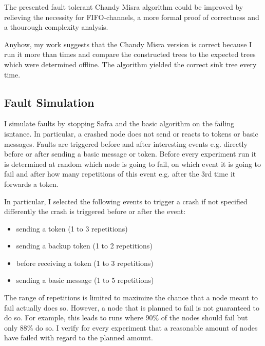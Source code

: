   The presented fault tolerant Chandy Misra algorithm could be improved by relieving the necessity for FIFO-channels, a more formal proof of correctness and a thourough complexity analysis.

  Anyhow, my work suggests that the Chandy Misra version is correct because I run it more than %
  times and compare the constructed trees to the expected trees which were determined offline. The algorithm yielded the correct sink tree every time.
   
  
  
\subsection{Fault Simulation}
	I simulate faults by stopping Safra and the basic algorithm on the failing isntance.
	In particular, a crashed node does not send or reacts to tokens or basic messages.
	Faults are triggered before and after interesting events e.g. directly before or after sending a basic message or token. 
	Before every experiment run it is determined at random which node is going to fail, on which event it is going to fail and after how many repetitions of this event e.g. after the 3rd time it forwards a token.
	
	In particular, I selected the following events to trigger a crash if not specified differently the crash is triggered before or after the event:
	\begin{itemize}
	   	\item sending a token (1 to 3 repetitions)
	   	\item sending a backup token (1 to 2 repetitions)
	   	\item before receiving a token (1 to 3 repetitions)
	   	\item sending a basic message (1 to 5 repetitions)
	\end{itemize}
	The range of repetitions is limited to maximize the chance that a node meant to fail actually does so. 
	However, a node that is planned to fail is not guaranteed to do so.
	For example, this leads to runs where 90\% of the nodes should fail but only 88\% do so.
	I verify for every experiment that a reasonable amount of nodes have failed with regard to the planned amount.
	
